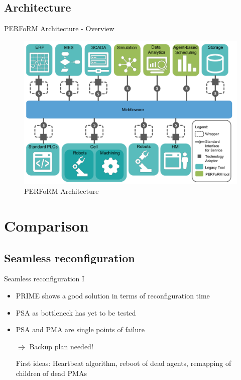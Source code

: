 \documentclass[12pt, xcolor=dvipsnames]{beamer}
\begin{document}
\subsection{Architecture}

\begin{frame}{PERFoRM Architecture - Overview}
	\begin{figure}
		\includegraphics[scale=0.25]{Specification-PERFoRM/PERFoRM-Architecture}
		\caption{PERFoRM Architecture \cite{Perform}}
	\end{figure}
\end{frame}

\section{Comparison}

\subsection{Seamless reconfiguration}
\begin{frame}{Seamless reconfiguration I}
	\begin{itemize}
		\item PRIME shows a good solution in terms of reconfiguration time
		\newline
		
		\item PSA as bottleneck has yet to be tested
		\newline
		
		\item PSA and PMA are single points of failure
		\newline
		
		$\Rrightarrow$ Backup plan needed!
		\newline
		
		First ideas: Heartbeat algorithm, reboot of dead agents, remapping of children of dead PMAs
	\end{itemize}
\end{frame}
\end{document}
